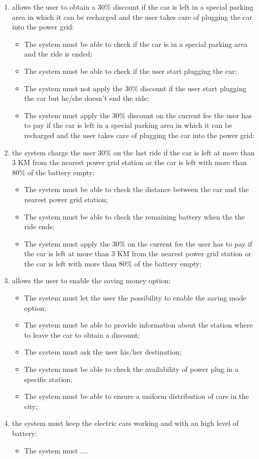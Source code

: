 \begin{enumerate}
\item allows the user to obtain a 30\% discount if the car is left in a special parking area in which it can be recharged and the user takes care of plugging the car into the power grid:

\begin{itemize}
\item The system must be able to check if the car is in a special parking area and the ride is ended;
\item The system must be able to check if the user start plugging the car;
\item The system must not apply the 30\% discount if the user start plugging the car but he/she doesn't end the ride;
\item The system must apply the 30\% discount on the current fee the user has to pay if the car is left in a special parking area in which it can be recharged and the user takes care of plugging the car into the power grid:
\end{itemize}

\item the system charge the user 30\% on the last ride if the car is left at more than 3 KM from the nearest power grid station or the car is left with more than 80\% of the battery empty:

\begin{itemize}
\item The system must be able to check the distance between the car and the nearest power grid station;
\item The system must be able to check the remaining battery when the the ride ends;
\item The system must apply the 30\% on the current fee the user has to pay if the car is left at more than 3 KM from the nearest power grid station or the car is left with more than 80\% of the battery empty;
\end{itemize}

\item allows the user to enable the saving money option:

\begin{itemize}
\item The system must let the user the possibility to enable the saving mode option;
\item The system must be able to provide information about the station where to leave the car to obtain a discount;
\item The system must ask the user his/her destination;
\item The system must be able to check the availability of power plug in a specific station;
\item The system must be able to ensure a uniform distribution of cars in the city;
\end{itemize}

\item the system must keep the electric cars working and with an high level of battery:
\begin{itemize}
\item The system must .... %
\end{itemize}
\end{enumerate}
